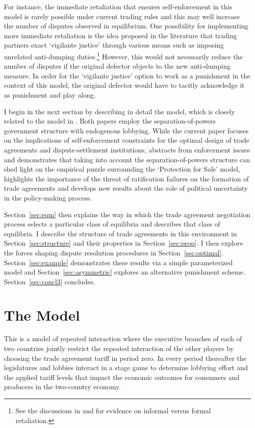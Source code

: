 \documentclass[authoryear, review]{elsarticle}
\begin{document}
For instance, the immediate retaliation that ensures self-enforcement in this model is rarely possible under current trading rules and this may well increase the number of disputes observed in equilibrium. One possibility for implementing more immediate retaliation is the idea proposed in the literature that trading partners exact `vigilante justice' through various means such as imposing unrelated anti-dumping duties.\footnote{See the discussions in \citet{bown2005} and \citet{martinvergote} for evidence on informal versus formal retaliation.} However, this would not necessarily reduce the number of disputes if the original defector objects to the new anti-dumping measure. In order for the `vigilante justice' option to work as a punishment in the context of this model, the original defector would have to tacitly acknowledge it as punishment and play along.

I begin in the next section by describing in detail the model, which is closely related to the model in \citet{buzard2013b}. Both papers employ the separation-of-powers government structure with endogenous lobbying. While the current paper focuses on the implications of self-enforcement constraints for the optimal design of trade agreements and dispute-settlement institutions, \citet{buzard2013b} abstracts from enforcement issues and demonstrates that taking into account the separation-of-powers structure can shed light on the empirical puzzle surrounding the \citet{gh94} `Protection for Sale' model, highlights the importance of the threat of ratification failures on the formation of trade agreements and develops new results about the role of political uncertainty in the policy-making process.

Section~\ref{sec:eqm} then explains the way in which the trade agreement negotiation process selects a particular class of equilibria and describes that class of equilibria. I describe the structure of trade agreements in this environment in Section~\ref{sec:structure} and their properties in Section~\ref{sec:prop}. I then explore the forces shaping dispute resolution procedures in Section~\ref{sec:optimal}. Section~\ref{sec:example} demonstrates these results via a simple parameterized model and Section~\ref{sec:asymmetric} explores an alternative punishment scheme. Section~\ref{sec:concl3} concludes.


\section{The Model}
\label{sec:model}
This is a model of repeated interaction where the executive branches of each of two countries jointly restrict the repeated interaction of the other players by choosing the trade agreement tariff in period zero. In every period thereafter the legislatures and lobbies interact in a stage game to determine lobbying effort and the applied tariff levels that impact the economic outcomes for consumers and producers in the two-country economy. 
\end{document}

